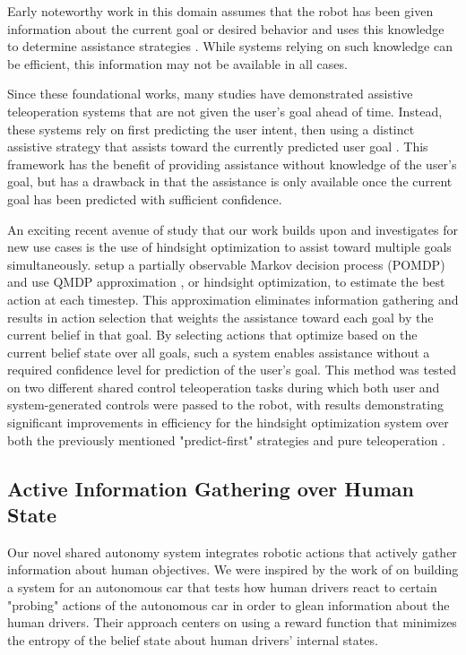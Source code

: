 \documentclass[conference]{IEEEtran}
\begin{document}
Early noteworthy work in this domain assumes that the robot has been given information about the current goal or desired behavior and uses this knowledge to determine assistance strategies \cite{aigner1997human, debus2001cooperative, goodrich2001experiments}. While systems relying on such knowledge can be efficient, this information may not be available in all cases.

Since these foundational works, many studies have demonstrated assistive teleoperation systems that are not given the user's goal ahead of time. Instead, these systems rely on first predicting the user intent, then using a distinct assistive strategy that assists toward the currently predicted user goal \cite{dragan2012formalizing, fagg2004extracting, kragic2005human, schultz2017goal, yu2005telemanipulation}. This framework has the benefit of providing assistance without knowledge of the user's goal, but has a drawback in that the assistance is only available once the current goal has been predicted with sufficient confidence. 

An exciting recent avenue of study that our work builds upon and investigates for new use cases is the use of hindsight optimization to assist toward multiple goals simultaneously. \citet{javdani2015shared} setup a partially observable Markov decision process (POMDP) and use QMDP approximation \cite{littman1995learning}, or hindsight optimization, to estimate the best action at each timestep. This approximation eliminates information gathering and results in action selection that weights the assistance toward each goal by the current belief in that goal. By selecting actions that optimize based on the current belief state over all goals, such a system enables assistance without a required confidence level for prediction of the user's goal. This method was tested on two different shared control teleoperation tasks during which both user and system-generated controls were passed to the robot, with results demonstrating significant improvements in efficiency for the hindsight optimization system over both the previously mentioned "predict-first" strategies and pure teleoperation \cite{javdani2018shared}.

\subsection{Active Information Gathering over Human State}
Our novel shared autonomy system integrates robotic actions that actively gather information about human objectives. We were inspired by the work of \citet{sadigh2016information} on building a system for an autonomous car that tests how human drivers react to certain "probing" actions of the autonomous car in order to glean information about the human drivers. Their approach centers on using a reward function that minimizes the entropy of the belief state about human drivers' internal states.
\end{document}

